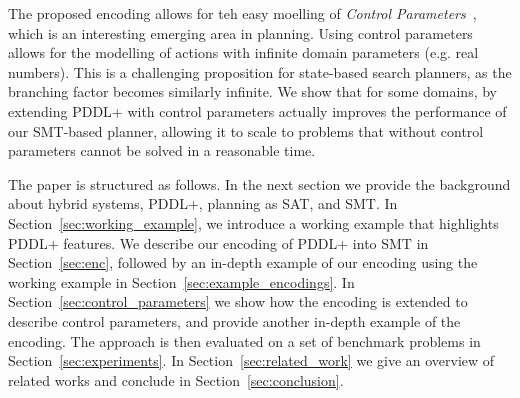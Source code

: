 The proposed encoding allows for teh easy moelling of \textit{Control Parameters}~\cite{savas2016planning}, which is an interesting emerging area in planning. Using control parameters allows for the modelling of actions with infinite domain parameters (e.g. real numbers). This is a challenging proposition for state-based search planners, as the branching factor becomes similarly infinite. We show that for some domains, by extending PDDL+ with control parameters actually improves the performance of our SMT-based planner, allowing it to scale to problems that without control parameters cannot be solved in a reasonable time.

The paper is structured as follows.
In the next section we provide the background about hybrid systems, PDDL+, planning as SAT, and SMT.
In Section~\ref{sec:working_example}, we introduce a working example that highlights PDDL+ features.
We describe our encoding of PDDL+ into SMT in Section~\ref{sec:enc}, followed by an in-depth example of our encoding using the working example in Section~\ref{sec:example_encodings}.
In Section~\ref{sec:control_parameters} we show how the encoding is extended to describe control parameters, and provide another in-depth example of the encoding.
The approach is then evaluated on a set of benchmark problems in Section~\ref{sec:experiments}.
In Section~\ref{sec:related_work} we give an overview of related works and conclude in Section~\ref{sec:conclusion}.
